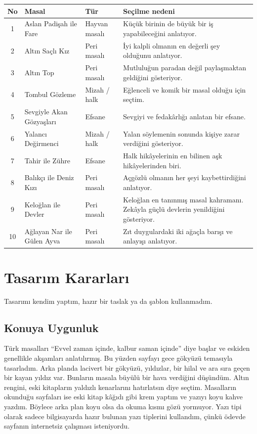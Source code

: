 \documentclass[12pt,a4paper]{article}
\begin{document}
\begin{longtable}{@{}cp{4cm}p{3cm}p{5.4cm}@{}}
\toprule
\textbf{No} & \textbf{Masal} & \textbf{Tür} & \textbf{Seçilme nedeni} \\
\midrule
\endhead
1 & Aslan Padişah ile Fare & Hayvan masalı & Küçük birinin de büyük bir iş yapabileceğini anlatıyor. \\
2 & Altın Saçlı Kız & Peri masalı & İyi kalpli olmanın en değerli şey olduğunu anlatıyor. \\
3 & Altın Top & Peri masalı & Mutluluğun paradan değil paylaşmaktan geldiğini gösteriyor. \\
4 & Tombul Gözleme & Mizah / halk & Eğlenceli ve komik bir masal olduğu için seçtim. \\
5 & Sevgiyle Akan Gözyaşları & Efsane & Sevgiyi ve fedakârlığı anlatan bir efsane. \\
6 & Yalancı Değirmenci & Mizah / halk & Yalan söylemenin sonunda kişiye zarar verdiğini gösteriyor. \\
7 & Tahir ile Zühre & Efsane & Halk hikâyelerinin en bilinen aşk hikâyelerinden biri. \\
8 & Balıkçı ile Deniz Kızı & Peri masalı & Açgözlü olmanın her şeyi kaybettirdiğini anlatıyor. \\
9 & Keloğlan ile Devler & Peri masalı & Keloğlan en tanınmış masal kahramanı. Zekâyla güçlü devlerin yenildiğini gösteriyor. \\
10 & Ağlayan Nar ile Gülen Ayva & Peri masalı & Zıt duygulardaki iki ağaçla barışı ve anlayışı anlatıyor. \\
\bottomrule
\end{longtable}

\section{Tasarım Kararları}
Tasarımı kendim yaptım, hazır bir taslak ya da şablon kullanmadım.

\subsection{Konuya Uygunluk}
Türk masalları ``Evvel zaman içinde, kalbur saman içinde'' diye başlar ve eskiden genellikle akşamları anlatılırmış. Bu yüzden sayfayı gece gökyüzü temasıyla tasarladım. Arka planda lacivert bir gökyüzü, yıldızlar, bir hilal ve ara sıra geçen bir kayan yıldız var. Bunların masala büyülü bir hava verdiğini düşündüm. Altın rengini, eski kitapların yaldızlı kenarlarını hatırlatsın diye seçtim. Masalların okunduğu sayfaları ise eski kitap kâğıdı gibi krem yaptım ve yazıyı koyu kahve yazdım. Böylece arka plan koyu olsa da okuma kısmı gözü yormuyor. Yazı tipi olarak sadece bilgisayarda hazır bulunan yazı tiplerini kullandım, çünkü ödevde sayfanın internetsiz çalışması isteniyordu.
\end{document}

